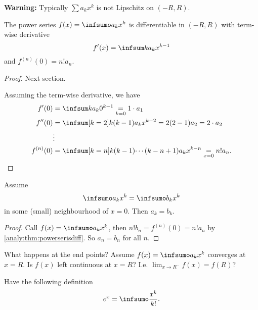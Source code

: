 \documentclass[10pt, a4paper]{article}
\begin{document}
\textbf{Warning:}
Typically $\sum a_kx ^ k$ is not Lipschitz on $(-R, R)$.

\begin{theorem}\label{analy:thm:powerserisdiff}
    The power series $f(x) = \infsumo a_kx ^ k$ is differentiable in $(-R, R)$ with term-wise derivative
    \[
    f'(x) = \infsum ka_kx ^ {k - 1}
    \]
    and $f ^ {(n)}(0) = n!a_n$.

    \begin{proof}
        Next section.
        
        Assuming the term-wise derivative,
        we have
        \begin{align*}
            f'(0) &= \infsum ka_k0 ^ {k - 1} \underset{k = 0}{=} 1 \cdot a_1 \\
            f''(0) &= \infsum[k = 2]k(k - 1)a_kx ^ {k - 2} = 2(2 - 1)a_2 = 2 \cdot a_2 \\
            &\vdots \\
            f ^ {(n)}(0) &= \infsum[k = n]k(k - 1) \dotsi (k - n + 1)a_kx ^ {k - n} \underset{x = 0}{=} n!a_n.
        \end{align*}
    \end{proof}
\end{theorem}

\begin{theorem}
    Assume
    \[
    \infsumo a_kx ^ k = \infsumo b_kx ^ k
    \]
    in some
    (small)
    neighbourhood of $x = 0$.
    Then $a_k = b_k$.

    \begin{proof}
        Call $f(x) = \infsumo a_kx ^ k$,
        then $n!b_n = f ^ {(n)}(0) = n!a_n$ by \autoref{analy:thm:powerserisdiff}.
        So $a_n = b_n$ for all $n$.
    \end{proof}
\end{theorem}

What happens at the end points?
Assume $f(x) = \infsumo a_kx ^ k$ converges at $x = R$.
Is $f(x)$ left continuous at $x = R$?
I.e. $\lim_{x \to R ^ {-}}f(x) = f(R)$?

\begin{theorem}
    
\end{theorem}

Have the following definition
\[
e ^ x = \infsumo\frac{x ^ k}{k!}.
\]
\end{document}
